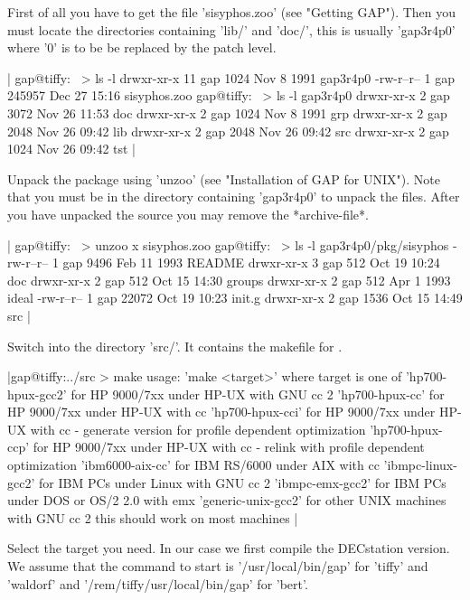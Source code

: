 First of all you have to get the file 'sisyphos.zoo' (see "Getting GAP").
Then you must locate the {\GAP} directories containing 'lib/' and 'doc/',
this is usually 'gap3r4p0' where '0' is to be be replaced by the patch
level.

|    gap@tiffy:~ > ls -l
    drwxr-xr-x  11 gap     1024 Nov  8  1991 gap3r4p0
    -rw-r--r--   1 gap   245957 Dec 27 15:16 sisyphos.zoo
    gap@tiffy:~ > ls -l gap3r4p0
    drwxr-xr-x   2 gap     3072 Nov 26 11:53 doc
    drwxr-xr-x   2 gap     1024 Nov  8  1991 grp
    drwxr-xr-x   2 gap     2048 Nov 26 09:42 lib
    drwxr-xr-x   2 gap     2048 Nov 26 09:42 src
    drwxr-xr-x   2 gap     1024 Nov 26 09:42 tst |

Unpack the package using 'unzoo'  (see "Installation  of GAP for  UNIX").
Note that you must be  in the directory  containing 'gap3r4p0' to  unpack
the  files.  After you    have unpacked the  source   you may  remove the
*archive-file*.

|    gap@tiffy:~ > unzoo x sisyphos.zoo
    gap@tiffy:~ > ls -l gap3r4p0/pkg/sisyphos
    -rw-r--r--  1 gap          9496 Feb 11  1993 README
    drwxr-xr-x  3 gap           512 Oct 19 10:24 doc
    drwxr-xr-x  2 gap           512 Oct 15 14:30 groups
    drwxr-xr-x  2 gap           512 Apr  1  1993 ideal
    -rw-r--r--  1 gap         22072 Oct 19 10:23 init.g
    drwxr-xr-x  2 gap          1536 Oct 15 14:49 src |

Switch into the directory 'src/'.  It contains the makefile for {\SISYPHOS}.

|gap@tiffy:../src > make
usage: 'make <target>'  where target is one of
'hp700-hpux-gcc2'    for HP 9000/7xx under HP-UX with GNU cc 2
'hp700-hpux-cc'      for HP 9000/7xx under HP-UX with cc
'hp700-hpux-cci'     for HP 9000/7xx under HP-UX with cc -
                       generate version for profile dependent optimization
'hp700-hpux-ccp'     for HP 9000/7xx under HP-UX with cc -
                       relink with profile dependent optimization
'ibm6000-aix-cc'     for IBM RS/6000 under AIX with cc
'ibmpc-linux-gcc2'   for IBM PCs under Linux with GNU cc 2
'ibmpc-emx-gcc2'     for IBM PCs under DOS or OS/2 2.0 with emx
'generic-unix-gcc2'  for other UNIX machines with GNU cc 2
                     this should work on most machines |

Select the  target  you need.   In our case we  first
compile the  DECstation version.  We assume  that the  command  to  start
{\GAP}   is   '/usr/local/bin/gap'   for   'tiffy'   and   'waldorf'   and
'/rem/tiffy/usr/local/bin/gap' for 'bert'.

